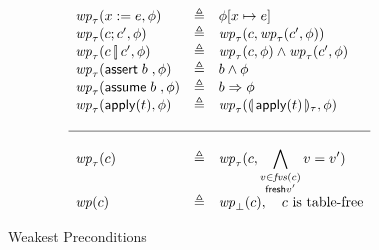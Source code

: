 \begin{figure}[ht]
  \[\begin{array}{l >{\triangleq}c l}
      \wp_\tau(x:=e, \phi) && \phi[x \mapsto e]\\
      \wp_\tau(c;c', \phi) && \wp_\tau(c, \wp_\tau(c', \phi)) \\
      \wp_\tau(c\angel c', \phi) && \wp_\tau(c, \phi) \wedge \wp_\tau(c',\phi) \\
      \wp_\tau(\assert b, \phi) && b \wedge \phi \\
      \wp_\tau(\assume b, \phi) && b \Rightarrow \phi \\
      \wp_\tau(\apply t, \phi) && \wp_\tau(\parenbb{\apply t}_\tau, \phi)\\\\\hline\\
      
      \wp_\tau(c) && \wp_\tau(c,\displaystyle \bigwedge_{\substack{v \in \fvs(c) \\ \mathsf{fresh} v'}} v = v') \\
      \wp(c) && \wp_\bot(c), \quad c \text{ is table-free}
    \end{array}\]
  \caption{Weakest Preconditions}
  \label{fig:wp}
\end{figure}

